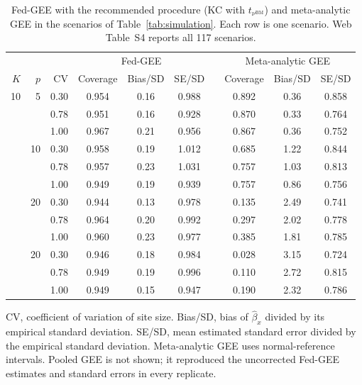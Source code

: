 \documentclass[12pt]{article}
\theoremstyle{remark}
\begin{document}
\begin{table}[ht]
\centering
\caption{Fed-GEE with the recommended procedure (KC with
$t_{\nu^{\mathrm{BM}}}$) and meta-analytic GEE in the scenarios of
Table~\ref{tab:simulation}. Each row is one scenario. Web Table~S4 reports all
117 scenarios.}
\label{tab:comparator}
\footnotesize
\begin{tabular*}{\textwidth}{@{\extracolsep{\fill}}rrrccccccc}
\toprule
& & & \multicolumn{3}{c}{Fed-GEE} & & \multicolumn{3}{c}{Meta-analytic GEE}\\
\cmidrule(lr){4-6}\cmidrule(lr){8-10}
$K$ & $p$ & CV & Coverage & Bias/SD & SE/SD & & Coverage & Bias/SD & SE/SD\\
\midrule
10 & 5 & 0.30 & 0.954 & 0.16 & 0.988 & & 0.892 & 0.36 & 0.858\\
 &  & 0.78 & 0.951 & 0.16 & 0.928 & & 0.870 & 0.33 & 0.764\\
 &  & 1.00 & 0.967 & 0.21 & 0.956 & & 0.867 & 0.36 & 0.752\\
\addlinespace
18 & 10 & 0.30 & 0.958 & 0.19 & 1.012 & & 0.685 & 1.22 & 0.844\\
 &  & 0.78 & 0.957 & 0.23 & 1.031 & & 0.757 & 1.03 & 0.813\\
 &  & 1.00 & 0.949 & 0.19 & 0.939 & & 0.757 & 0.86 & 0.756\\
\addlinespace
30 & 20 & 0.30 & 0.944 & 0.13 & 0.978 & & 0.135 & 2.49 & 0.741\\
 &  & 0.78 & 0.964 & 0.20 & 0.992 & & 0.297 & 2.02 & 0.778\\
 &  & 1.00 & 0.960 & 0.23 & 0.977 & & 0.385 & 1.81 & 0.785\\
\addlinespace
50 & 20 & 0.30 & 0.946 & 0.18 & 0.984 & & 0.028 & 3.15 & 0.724\\
 &  & 0.78 & 0.949 & 0.19 & 0.996 & & 0.110 & 2.72 & 0.815\\
 &  & 1.00 & 0.949 & 0.15 & 0.947 & & 0.190 & 2.32 & 0.786\\
\bottomrule
\end{tabular*}

\vspace{3pt}
\parbox{\textwidth}{\footnotesize CV, coefficient of variation of site size.
Bias/SD, bias of $\widehat\beta_x$ divided by its empirical standard deviation.
SE/SD, mean estimated standard error divided by the empirical standard deviation.
Meta-analytic GEE uses normal-reference intervals. Pooled GEE is not shown; it
reproduced the uncorrected Fed-GEE estimates and standard errors in every
replicate.}
\end{table}
\end{document}
